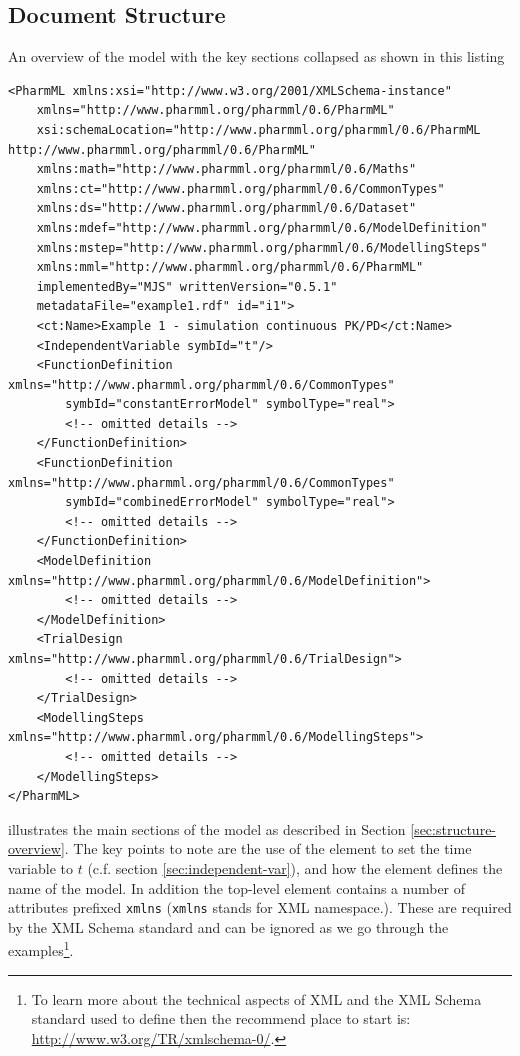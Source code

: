 \subsection{\pharmml Document Structure}
\label{sec:symbol-defn}
An overview of the model with the key sections collapsed  as shown in this listing
\lstset{language=XML}
\begin{lstlisting}
<PharmML xmlns:xsi="http://www.w3.org/2001/XMLSchema-instance"
    xmlns="http://www.pharmml.org/pharmml/0.6/PharmML"
    xsi:schemaLocation="http://www.pharmml.org/pharmml/0.6/PharmML http://www.pharmml.org/pharmml/0.6/PharmML"
    xmlns:math="http://www.pharmml.org/pharmml/0.6/Maths"
    xmlns:ct="http://www.pharmml.org/pharmml/0.6/CommonTypes"
    xmlns:ds="http://www.pharmml.org/pharmml/0.6/Dataset"
    xmlns:mdef="http://www.pharmml.org/pharmml/0.6/ModelDefinition"
    xmlns:mstep="http://www.pharmml.org/pharmml/0.6/ModellingSteps"
    xmlns:mml="http://www.pharmml.org/pharmml/0.6/PharmML"
    implementedBy="MJS" writtenVersion="0.5.1" 
    metadataFile="example1.rdf" id="i1">
    <ct:Name>Example 1 - simulation continuous PK/PD</ct:Name>
    <IndependentVariable symbId="t"/>
    <FunctionDefinition xmlns="http://www.pharmml.org/pharmml/0.6/CommonTypes" 
    	symbId="constantErrorModel" symbolType="real">
        <!-- omitted details -->
    </FunctionDefinition>
    <FunctionDefinition xmlns="http://www.pharmml.org/pharmml/0.6/CommonTypes" 
    	symbId="combinedErrorModel" symbolType="real">
        <!-- omitted details -->
    </FunctionDefinition>
    <ModelDefinition xmlns="http://www.pharmml.org/pharmml/0.6/ModelDefinition">
        <!-- omitted details -->
    </ModelDefinition>
    <TrialDesign xmlns="http://www.pharmml.org/pharmml/0.6/TrialDesign">
        <!-- omitted details -->
    </TrialDesign>
    <ModellingSteps xmlns="http://www.pharmml.org/pharmml/0.6/ModellingSteps">
        <!-- omitted details -->
    </ModellingSteps>
</PharmML>
\end{lstlisting}


illustrates the main sections of the model as described
in Section \ref{sec:structure-overview}. The key points to note are
the use of the   element to set the time
variable to $t$ (c.f.\xspace section \ref{sec:independent-var}), and
how the element  defines the name of the model. In addition
the top-level  element contains a number of attributes
prefixed \texttt{xmlns} (\texttt{xmlns} stands for XML namespace.). These 
are required by the XML Schema standard
and can be ignored as we go through the examples\footnote{To learn more 
about the technical aspects of XML and the XML Schema standard
  used to define \pharmml then the recommend place to start is:
  \url{http://www.w3.org/TR/xmlschema-0/}.}.

